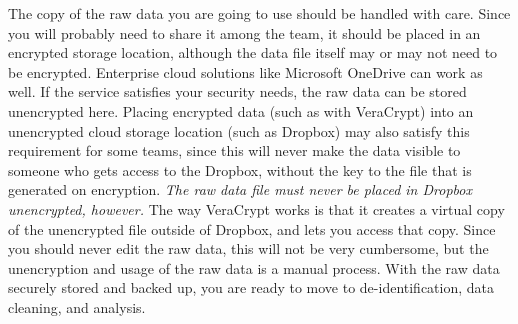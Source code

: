 The copy of the raw data you are going to use
should be handled with care.
Since you will probably need to share it among the team,
it should be placed in an encrypted storage location,
although the data file itself may or may not need to be encrypted.
Enterprise cloud solutions like Microsoft OneDrive can work as well.
If the service satisfies your security needs,
the raw data can be stored unencrypted here.
Placing encrypted data (such as with VeraCrypt)
into an unencrypted cloud storage location (such as Dropbox)
may also satisfy this requirement for some teams,
since this will never make the data visible to someone
who gets access to the Dropbox,
without the key to the file that is generated on encryption.
\textit{The raw data file must never be placed in Dropbox unencrypted, however.}
The way VeraCrypt works is that it creates a virtual copy
of the unencrypted file outside of Dropbox, and lets you access that copy.
Since you should never edit the raw data, this will not be very cumbersome,
but the unencryption and usage of the raw data is a manual process.
With the raw data securely stored and backed up,
you are ready to move to de-identification, data cleaning, and analysis.

